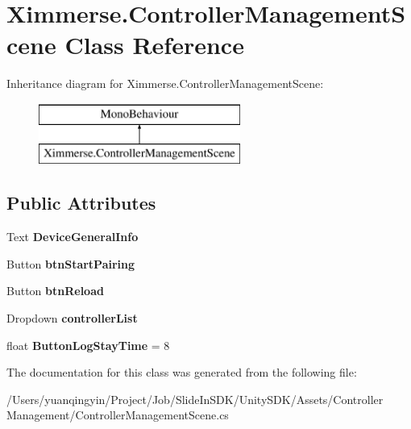 \hypertarget{class_ximmerse_1_1_controller_management_scene}{}\section{Ximmerse.\+Controller\+Management\+Scene Class Reference}
\label{class_ximmerse_1_1_controller_management_scene}
Inheritance diagram for Ximmerse.\+Controller\+Management\+Scene\+:\begin{figure}[H]
\begin{center}
\leavevmode
\includegraphics[height=2.000000cm]{class_ximmerse_1_1_controller_management_scene}
\end{center}
\end{figure}
\subsection*{Public Attributes}
\begin{DoxyCompactItemize}
\item 
\mbox{\label{class_ximmerse_1_1_controller_management_scene_a369912a2b2441455139381b33e76c504}} 
Text {\bfseries Device\+General\+Info}
\item 
\mbox{\label{class_ximmerse_1_1_controller_management_scene_ada14fefd8380ce1aebdfc6054b23d34a}} 
Button {\bfseries btn\+Start\+Pairing}
\item 
\mbox{\label{class_ximmerse_1_1_controller_management_scene_a7bd99874c7ac159343145ebbf2b6d349}} 
Button {\bfseries btn\+Reload}
\item 
\mbox{\label{class_ximmerse_1_1_controller_management_scene_aeaf06441cb94e13aaf0e019bfb864cd2}} 
Dropdown {\bfseries controller\+List}
\item 
\mbox{\label{class_ximmerse_1_1_controller_management_scene_abfd648292a08188bb8d8b6c3dd2cbe62}} 
float {\bfseries Button\+Log\+Stay\+Time} = 8
\end{DoxyCompactItemize}


The documentation for this class was generated from the following file\+:\begin{DoxyCompactItemize}
\item 
/\+Users/yuanqingyin/\+Project/\+Job/\+Slide\+In\+S\+D\+K/\+Unity\+S\+D\+K/\+Assets/\+Controller Management/Controller\+Management\+Scene.\+cs\end{DoxyCompactItemize}
